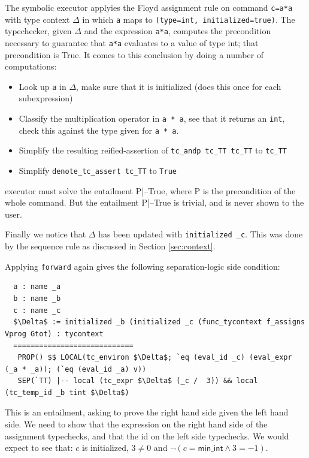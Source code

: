 \documentclass{puthesis}
\begin{document}
The symbolic executor applyies the Floyd assignment rule on command
\lstinline|c=a*a| with type context $\Delta$ in which \lstinline|a|
maps to \lstinline|(type=int, initialized=true)|.  The typechecker,
given $\Delta$ and the expression \lstinline|a*a|, computes the
precondition necessary to guarantee that \lstinline|a*a| evaluates to
a value of type int; that precondition is True. It comes to this
conclusion by doing a number of computations:

\begin{itemize}
\item Look up \lstinline|a| in $\Delta$, make sure that it is initialized
  (does this once for each subexpression)
\item Classify the multiplication operator in \lstinline|a * a|, see
  that it returns an \lstinline|int|, check this against the type
  given for \lstinline|a * a|.
\item Simplify the resulting reified-assertion of 
  \lstinline|tc_andp tc_TT tc_TT| to \lstinline|tc_TT|
\item Simplify \lstinline|denote_tc_assert tc_TT| to \lstinline|True|
\end{itemize}

executor must solve the entailment P|--True, where P is the
precondition of the whole command.  But the entailment
P|--True is trivial, and is never shown to the user.

Finally we notice that $\Delta$ has been updated with 
\lstinline|initialized _c|. This was done by the sequence rule as discussed in
Section \ref{sec:context}.

Applying \lstinline|forward| again gives 
the following separation-logic side condition: 

\begin{lstlisting}
  a : name _a
  b : name _b
  c : name _c
  $\Delta$ := initialized _b (initialized _c (func_tycontext f_assigns Vprog Gtot) : tycontext 
  ============================
   PROP() $$ LOCAL(tc_environ $\Delta$; `eq (eval_id _c) (eval_expr (_a * _a)); (`eq (eval_id _a) v)) 
   SEP(`TT) |-- local (tc_expr $\Delta$ (_c /  3)) && local (tc_temp_id _b tint $\Delta$)
\end{lstlisting}
\noindent This is an entailment, asking to prove the right hand side given
the left hand side. We need to show that the expression on the right hand side
of the assignment typechecks, and that the id on the left side typechecks. We
would expect to see that: $c$ is initialized, $3\neq 0$ and
$\neg(c=\mathsf{min\_int} \wedge 3 = -1)$.
\end{document}
